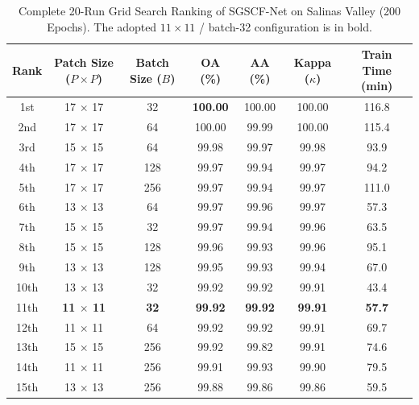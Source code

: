 \documentclass[manuscript,screen,review]{acmart}
\begin{document}
\begin{table}[t]
\centering
\footnotesize
\caption{Complete 20-Run Grid Search Ranking of SGSCF-Net on Salinas Valley (200 Epochs). The adopted $11 \times 11$ / batch-32 configuration is in bold.}
\label{tab:grid_search_sv}
\begin{tabular*}{\textwidth}{@{\extracolsep{\fill}}ccccccc}
\toprule
\textbf{Rank} & \textbf{Patch Size ($P \times P$)} & \textbf{Batch Size ($B$)} & \textbf{OA (\%)} & \textbf{AA (\%)} & \textbf{Kappa ($\kappa$)} & \textbf{Train Time (min)} \\
\midrule
1st  & 17 $\times$ 17          & 32           & \textbf{100.00} & 100.00 & 100.00 & 116.8 \\
2nd  & 17 $\times$ 17          & 64           & 100.00          & 99.99  & 100.00 & 115.4 \\
3rd  & 15 $\times$ 15          & 64           & 99.98           & 99.97  & 99.98  & 93.9 \\
4th  & 17 $\times$ 17          & 128          & 99.97           & 99.94  & 99.97  & 94.2 \\
5th  & 17 $\times$ 17          & 256          & 99.97           & 99.94  & 99.97  & 111.0 \\
6th  & 13 $\times$ 13          & 64           & 99.97           & 99.96  & 99.97  & 57.3 \\
7th  & 15 $\times$ 15          & 32           & 99.97           & 99.94  & 99.96  & 63.5 \\
8th  & 15 $\times$ 15          & 128          & 99.96           & 99.93  & 99.96  & 95.1 \\
9th  & 13 $\times$ 13          & 128          & 99.95           & 99.93  & 99.94  & 67.0 \\
10th & 13 $\times$ 13          & 32           & 99.92           & 99.92  & 99.91  & 43.4 \\
11th & \textbf{11 $\times$ 11} & \textbf{32}  & \textbf{99.92}  & \textbf{99.92} & \textbf{99.91} & \textbf{57.7} \\
12th & 11 $\times$ 11          & 64           & 99.92           & 99.92  & 99.91  & 69.7 \\
13th & 15 $\times$ 15          & 256          & 99.92           & 99.82  & 99.91  & 74.6 \\
14th & 11 $\times$ 11          & 256          & 99.91           & 99.93  & 99.90  & 79.5 \\
15th & 13 $\times$ 13          & 256          & 99.88           & 99.86  & 99.86  & 59.5 \\

\end{tabular*}
\end{table}
\end{document}
